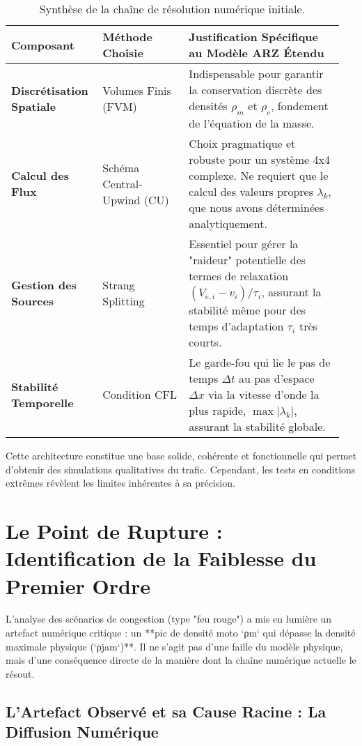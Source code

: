 \begin{table}[h!]
\centering
\caption{Synthèse de la chaîne de résolution numérique initiale.}
\label{tab:chaine_initiale_synthese}
\begin{tabular}{|p{0.25\linewidth}|p{0.25\linewidth}|p{0.45\linewidth}|}
\hline
\textbf{Composant} & \textbf{Méthode Choisie} & \textbf{Justification Spécifique au Modèle ARZ Étendu} \\
\hline
\textbf{Discrétisation Spatiale} & Volumes Finis (FVM) & Indispensable pour garantir la conservation discrète des densités \(\rho_m\) et \(\rho_c\), fondement de l'équation de la masse. \\
\hline
\textbf{Calcul des Flux} & Schéma Central-Upwind (CU) & Choix pragmatique et robuste pour un système 4x4 complexe. Ne requiert que le calcul des valeurs propres \(\lambda_k\), que nous avons déterminées analytiquement. \\
\hline
\textbf{Gestion des Sources} & Strang Splitting & Essentiel pour gérer la "raideur" potentielle des termes de relaxation \((V_{e,i} - v_i)/\tau_i\), assurant la stabilité même pour des temps d'adaptation \(\tau_i\) très courts. \\
\hline
\textbf{Stabilité Temporelle} & Condition CFL & Le garde-fou qui lie le pas de temps \(\Delta t\) au pas d'espace \(\Delta x\) via la vitesse d'onde la plus rapide, \(\max|\lambda_k|\), assurant la stabilité globale. \\
\hline
\end{tabular}
\end{table}

Cette architecture constitue une base solide, cohérente et fonctionnelle qui permet d'obtenir des simulations qualitatives du trafic. Cependant, les tests en conditions extrêmes révèlent les limites inhérentes à sa précision.

\section{Le Point de Rupture : Identification de la Faiblesse du Premier Ordre}
\label{sec:point_de_rupture}

L'analyse des scénarios de congestion (type "feu rouge") a mis en lumière un artefact numérique critique : un **pic de densité moto `ρm` qui dépasse la densité maximale physique (`ρjam`)**. Il ne s'agit pas d'une faille du modèle physique, mais d'une conséquence directe de la manière dont la chaîne numérique actuelle le résout.

\subsection{L'Artefact Observé et sa Cause Racine : La Diffusion Numérique}

